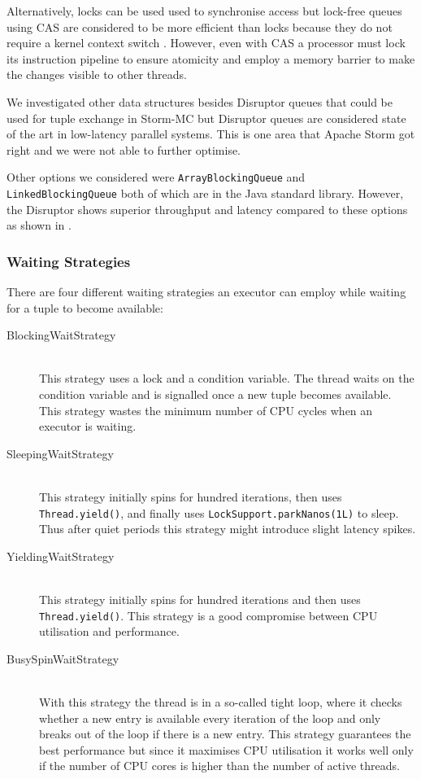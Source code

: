 Alternatively, locks can be used used to synchronise access but lock-free queues using CAS are considered to be more efficient than locks because they do not require a kernel context switch \cite{Thompson_Farley_Barker_Gee_Stewart_2011}. However, even with CAS a processor must lock its instruction pipeline to ensure atomicity and employ a memory barrier to make the changes visible to other threads.

We investigated other data structures besides Disruptor queues that could be used for tuple exchange in Storm-MC but Disruptor queues are considered state of the art in low-latency parallel systems. This is one area that Apache Storm got right and we were not able to further optimise.

Other options we considered were \texttt{ArrayBlockingQueue} and \texttt{LinkedBlockingQueue} both of which are in the Java standard library. However, the Disruptor shows superior throughput and latency compared to these options as shown in \citep{DisruptorWiki}.

\subsubsection{Waiting Strategies}
\label{subsubsec:waiting}

There are four different waiting strategies an executor can employ while waiting for a tuple to become available:

\begin{description}
	\item[BlockingWaitStrategy] \hfill \\
	This strategy uses a lock and a condition variable. The thread waits on the condition variable and is signalled once a new tuple becomes available. This strategy wastes the minimum number of CPU cycles when an executor is waiting.
	\item[SleepingWaitStrategy] \hfill \\
	This strategy initially spins for hundred iterations, then uses \texttt{Thread.yield()}, and finally uses \texttt{LockSupport.parkNanos(1L)} to sleep. Thus after quiet periods this strategy might introduce slight latency spikes.
	\item[YieldingWaitStrategy] \hfill \\
	This strategy initially spins for hundred iterations and then uses \texttt{Thread.yield()}. This strategy is a good compromise between CPU utilisation and performance.
	\item[BusySpinWaitStrategy] \hfill \\
	With this strategy the thread is in a so-called tight loop, where it checks whether a new entry is available every iteration of the loop and only breaks out of the loop if there is a new entry. This strategy guarantees the best performance but since it maximises CPU utilisation it works well only if the number of CPU cores is higher than the number of active threads.
\end{description}

